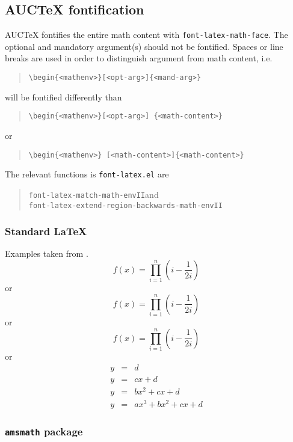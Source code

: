\documentclass[a4paper]{article}
\begin{document}
\subsection{AUC\protect\TeX{} fontification}

AUC\TeX{} fontifies the entire math content with
\texttt{font-latex-math-face}.  The optional and mandatory argument(s)
should not be fontified.  Spaces or line breaks are used in order to
distinguish argument from math content, i.e.
\begin{quote}
\verb|\begin{<mathenv>}[<opt-arg>]{<mand-arg>}|
\end{quote}
will be fontified differently than
\begin{quote}
\verb|\begin{<mathenv>}[<opt-arg>] {<math-content>}|
\end{quote}
or
\begin{quote}
\verb|\begin{<mathenv>} [<math-content>]{<math-content>}|
\end{quote}

The relevant functions is \verb|font-latex.el| are
\begin{quote}
\verb|font-latex-match-math-envII|\quad and \\
\verb|font-latex-extend-region-backwards-math-envII|
\end{quote}

\subsubsection{Standard \protect\LaTeX{}}

Examples taken from \cite{voss16}.
\begin{equation}
f(x)=\prod_{i=1}^{n}\left(i-\frac{1}{2i}\right)
\end{equation}
or
\begin{displaymath}
f(x)=\prod_{i=1}^{n}\left(i-\frac{1}{2i}\right)
\end{displaymath}
or
\[ f(x)=\prod_{i=1}^{n}\left(i-\frac{1}{2i}\right) \]
or
\begin{eqnarray*}
  y & = & d\\
  y & = & cx+d\\
  y & = & bx^{2}+cx+d\\
  y & = & ax^{3}+bx^{2}+cx+d
\end{eqnarray*}

\subsubsection{\texttt{amsmath} package}
\end{document}
